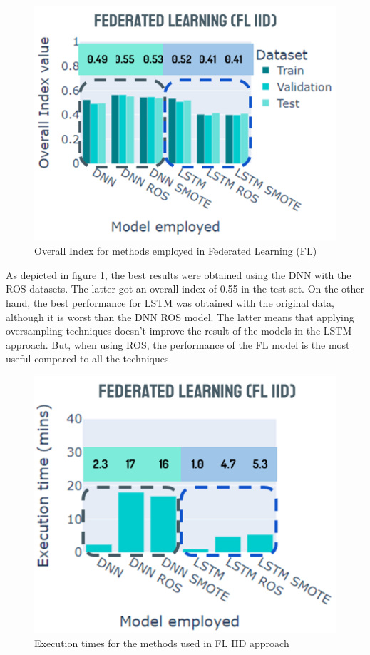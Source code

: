 \begin{figure}[H]
\centering
\includegraphics[scale=0.59]{img/fl_iid_methods.png}
\caption{Overall Index for methods employed in Federated Learning (FL)}
\label{fig:fl_iid_methods}
\end{figure}

As depicted in figure \ref{fig:fl_iid_methods}, the best results were obtained using the DNN with the ROS datasets. The latter got an overall index of 0.55 in the test set. On the other hand, the best performance for LSTM was obtained with the original data, although it is worst than the DNN ROS model. The latter means that applying oversampling techniques doesn't improve the result of the models in the LSTM approach. But, when using ROS, the performance of the FL model is the most useful compared to all the techniques.

\begin{figure}[H]
\centering
\includegraphics[scale=0.6]{img/times_fl_iid.png}
\caption{Execution times for the methods used in FL IID approach}
\label{fig:times_fl_iid}
\end{figure}

